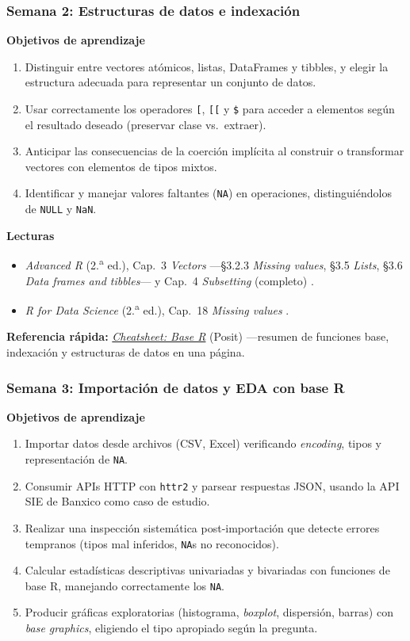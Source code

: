 \documentclass[11pt,letterpaper]{article}
\newcommand{\semana}[2]{%
  \subsubsection*{\color{main}Semana #1: #2}%
}
\newcommand{\cheatsheet}[2]{%
  \href{https://rstudio.github.io/cheatsheets/#1.pdf}{\textit{Cheatsheet: #2}}%
}
\begin{document}
\semana{2}{Estructuras de datos e indexación}

\medskip
\noindent\textbf{Objetivos de aprendizaje}
\begin{enumerate}[leftmargin=*, itemsep=1pt]
    \item Distinguir entre vectores atómicos, listas, DataFrames y tibbles, y elegir la estructura adecuada para representar un conjunto de datos.
    \item Usar correctamente los operadores \texttt{[}, \texttt{[[} y \texttt{\$} para acceder a elementos según el resultado deseado (preservar clase vs.\ extraer).
    \item Anticipar las consecuencias de la coerción implícita al construir o transformar vectores con elementos de tipos mixtos.
    \item Identificar y manejar valores faltantes (\texttt{NA}) en operaciones, distinguiéndolos de \texttt{NULL} y \texttt{NaN}.
\end{enumerate}

\medskip
\noindent\textbf{Lecturas}
\begin{itemize}[leftmargin=*, itemsep=1pt]
    \item \textit{Advanced R} (2.\textsuperscript{a} ed.), Cap.\ 3 \textit{Vectors} ---§3.2.3 \textit{Missing values}, §3.5 \textit{Lists}, §3.6 \textit{Data frames and tibbles}--- y Cap.\ 4 \textit{Subsetting} (completo) \cite{wickham2019advr}.
    \item \textit{R for Data Science} (2.\textsuperscript{a} ed.), Cap.\ 18 \textit{Missing values} \cite{wickham2023r4ds}.
\end{itemize}

\medskip
\noindent\textbf{Referencia rápida:} \cheatsheet{base-r}{Base R} (Posit) ---resumen de funciones base, indexación y estructuras de datos en una página.

\semana{3}{Importación de datos y EDA con base R}

\medskip
\noindent\textbf{Objetivos de aprendizaje}
\begin{enumerate}[leftmargin=*, itemsep=1pt]
    \item Importar datos desde archivos (CSV, Excel) verificando \textit{encoding}, tipos y representación de \texttt{NA}.
    \item Consumir APIs HTTP con \texttt{httr2} y parsear respuestas JSON, usando la API SIE de Banxico como caso de estudio.
    \item Realizar una inspección sistemática post-importación que detecte errores tempranos (tipos mal inferidos, \texttt{NA}s no reconocidos).
    \item Calcular estadísticas descriptivas univariadas y bivariadas con funciones de base R, manejando correctamente los \texttt{NA}.
    \item Producir gráficas exploratorias (histograma, \textit{boxplot}, dispersión, barras) con \textit{base graphics}, eligiendo el tipo apropiado según la pregunta.
\end{enumerate}
\end{document}
